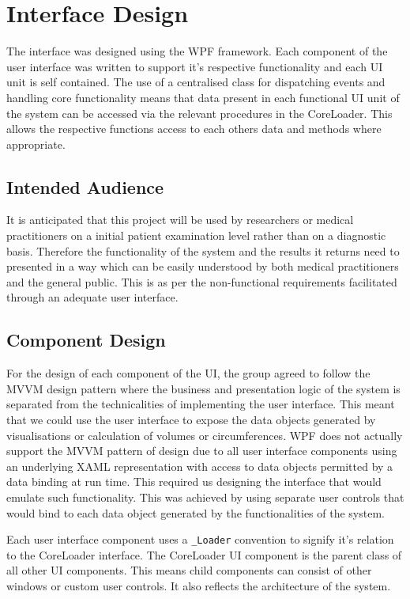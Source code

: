 \section{Interface Design}
\label{design:interface}

The interface was designed using the WPF framework. Each component of the user interface was written to support it's respective functionality and each UI unit is self contained. The use of a centralised class for dispatching events and handling core functionality means that data present in each functional UI unit of the system can be accessed via the relevant procedures in the CoreLoader. This allows the respective functions access to each others data and methods where appropriate.

\subsection{Intended Audience}

It is anticipated that this project will be used by researchers or medical practitioners on a initial patient examination level rather than on a diagnostic basis. Therefore the functionality of the system and the results it returns need to presented in a way which can be easily understood by both medical practitioners and the general public. This is as per the non-functional requirements facilitated through an adequate user interface.

\subsection{Component Design}

For the design of each component of the UI, the group agreed to follow the MVVM design pattern where the business and presentation logic of the system is separated from the technicalities of implementing the user interface. This meant that we could use the user interface to expose the data objects generated by visualisations or calculation of volumes or circumferences. WPF does not actually support the MVVM pattern of design due to all user interface components using an underlying XAML representation with access to data objects permitted by a data binding at run time. This required us designing the interface that would emulate such functionality. This was achieved by using separate user controls that would bind to each data object generated by the functionalities of the system.

Each user interface component uses a \texttt{\_Loader} convention to signify it's relation to the CoreLoader interface. The CoreLoader UI component is the parent class of all other UI components. This means child components can consist of other windows or custom user controls. It also reflects the architecture of the system. 


